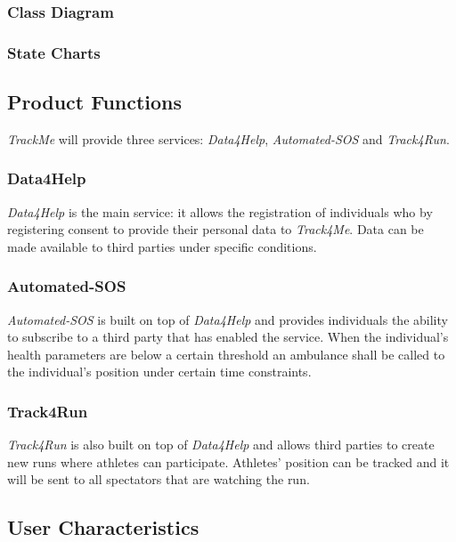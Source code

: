 \documentclass[a4paper]{article}
\begin{document}
    \subsubsection{Class Diagram}
    
    \subsubsection{State Charts}
    
    \subsection{Product Functions}
    \textit{TrackMe} will provide three services: \textit{Data4Help}, \textit{Automated-SOS} and \textit{Track4Run}.
    
    \subsubsection{Data4Help}
    \textit{Data4Help} is the main service: it allows the registration of individuals who by registering consent to provide their personal data to \textit{Track4Me}. Data can be made available to third parties under specific conditions.
    
    \subsubsection{Automated-SOS}
    \textit{Automated-SOS} is built on top of \textit{Data4Help} and provides individuals the ability to subscribe to a third party that has enabled the service. When the individual's health parameters are below a certain threshold an ambulance shall be called to the individual's position under certain time constraints.
    
    \subsubsection{Track4Run}
    \textit{Track4Run} is also built on top of \textit{Data4Help} and allows third parties to create new runs where athletes can participate. Athletes' position can be tracked and it will be sent to all spectators that are watching the run.
    
    \subsection{User Characteristics}
    
\end{document}
